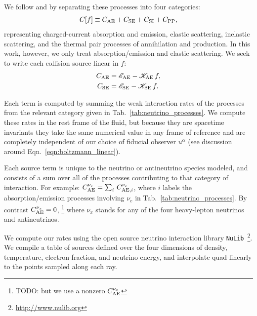 \documentclass[aps,floatfix,prd,superscriptaddress,twocolumn]{revtex4-1}
\begin{document}
We follow
\cite{brue1985-core_collapse} and \cite[Sec.~4]{shib2011-truncated_moment}
by separating these processes into four categories:
\begin{equation}
  \label{eqn:four_sources}
  C[f] \equiv C_{\rm AE} + C_{\rm SE} + C_{\rm SI} + C_{\rm PP},
\end{equation}
representing charged-current absorption and emission, elastic scattering,
inelastic scattering, and the thermal pair processes of annihilation and
production. In this work, however, we only treat absorption/emission
and elastic scattering.
We seek to write each collision source linear in $f$:
\begin{align}
  \label{eqn:sources_cae}
  C_{\rm AE}
  &= \mathscr{E}_{\rm AE} - \mathscr{K}_{\rm AE}\, f, \\
  \label{eqn:sources_cse}
  C_{\rm SE}
  &= \mathscr{E}_{\rm SE} - \mathscr{K}_{\rm SE}\, f.
\end{align}

Each term
is computed by summing the weak interaction rates of the processes from the
relevant category given in Tab.~\ref{tab:neutrino_processes}.
We compute these rates in the rest frame of the fluid,
but because they are spacetime invariants
they take the same numerical value in any frame of reference
and are completely independent of our choice of fiducial observer $u^\alpha$
(see discussion around Eqn.~\ref{eqn:boltzmann_linear}).

Each source term is unique to the neutrino or antineutrino species modeled,
and consists of a sum over all of the processes contributing to that
category of interaction. For example:
$C^{\nu_e}_{{\rm AE}} = \sum_i\,C^{\nu_e}_{{\rm AE},i}$,
where $i$ labels the absorption/emission processes involving $\nu_e$
in Tab.~\ref{tab:neutrino_processes}.
By contrast $C^{\nu_x}_{{\rm AE}} = 0$,
\footnote{TODO: but we use a nonzero $C^{\nu_x}_{{\rm AE}}$}
where $\nu_x$ stands for any of the four heavy-lepton neutrinos and
antineutrinos.

We compute our rates using the open source neutrino interaction
library \lstinline{NuLib}~\footnote{\url{http://www.nulib.org}}.
We compile a table of sources defined over the four dimensions of
density, temperature, electron-fraction, and neutrino energy, and
interpolate quad-linearly to the points sampled along each ray.
\end{document}

